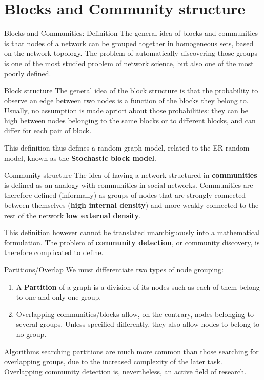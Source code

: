 \newpage

\section{Blocks and Community structure}

\begin{textbox}{Blocks and Communities: Definition}
The general idea of blocks and communities is that nodes of a network can be grouped together in homogeneous sets, based on the network topology. The problem of automatically discovering those groups is one of the most studied problem of network science, but also one of the most poorly defined.

\end{textbox}

\begin{textbox}{Block structure}
The general idea of the block structure is that the probability to observe an edge between two nodes is a function of the blocks they belong to. Usually, no assumption is made apriori about those probabilities: they can be high between nodes belonging to the same blocks or to different blocks, and can differ for each pair of block.

This definition thus defines a random graph model, related to the ER random model, known as the \textbf{Stochastic block model}. 
\end{textbox}

\begin{textbox}{Community structure}
The idea of having a network structured in \textbf{communities} is defined as an analogy with communities in social networks. Communities are therefore defined (informally) as groups of nodes that are strongly connected between themselves (\textbf{high internal density}) and more weakly connected to the rest of the network \textbf{low external density}.

This definition however cannot be translated unambiguously into a mathematical formulation. The problem of \textbf{community detection}, or community discovery, is therefore complicated to define.
\end{textbox}

\begin{textbox}{Partitions/Overlap}
We must differentiate two types of node grouping: 
\begin{enumerate}
    \item A \textbf{Partition} of a graph is a division of its nodes such as each of them belong to one and only one group.
    \item Overlapping communities/blocks allow, on the contrary, nodes belonging to several groups. Unless specified differently, they also allow nodes to belong to no group.
\end{enumerate}
Algorithms searching partitions are much more common than those searching for overlapping groups, due to the increased complexity of the later task. Overlapping community detection is, nevertheless, an active field of research.
\end{textbox}

